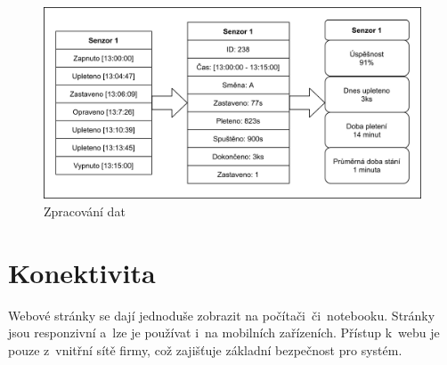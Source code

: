 \begin{figure}[htbp]
    \centering
    \includegraphics[width=\textwidth]{img/Princip.png}
    \caption{Zpracování dat}
    \label{fig:princip}
\end{figure}

\section{Konektivita}
Webové stránky se dají jednoduše zobrazit na počítači~či~notebooku.
Stránky jsou responzivní a~lze je používat i~na mobilních zařízeních.
Přístup k~webu je pouze z~vnitřní sítě firmy, což zajišťuje základní bezpečnost pro systém.


\newpage